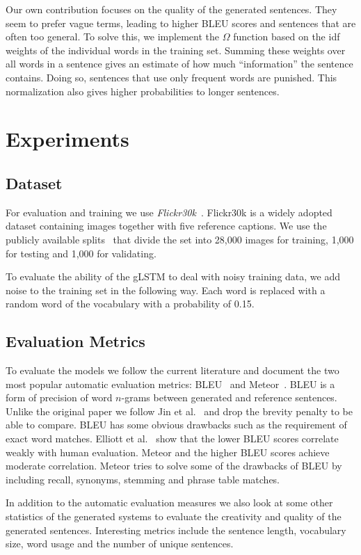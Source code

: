 \documentclass[twoside,twocolumn]{article}
\begin{document}
	Our own contribution focuses on the quality of the generated sentences. They seem to prefer vague terms, leading to higher BLEU scores and sentences that are often too general. To solve this, we implement the $\Omega$ function based on the idf weights of the individual words in the training set. Summing these weights over all words in a sentence gives an estimate of how much ``information'' the sentence contains. Doing so, sentences that use only frequent words are punished. This normalization also gives higher probabilities to longer sentences.
	
	
	\section{Experiments}
	\label{sec:exp}
	\subsection{Dataset}
	For evaluation and training we use \emph{Flickr30k}~\cite{Young2014}. Flickr30k is a widely adopted dataset containing images together with five reference captions. We use the publicly available splits~\cite{Karpathy2014} that divide the set into 28,000 images for training, 1,000 for testing and 1,000 for validating. 
	
	To evaluate the ability of the gLSTM to deal with noisy training data, we add noise to the training set in the following way.
	Each word is replaced with a random word of the vocabulary with a probability of 0.15.
	
	\subsection{Evaluation Metrics}
	To evaluate the models we follow the current literature and document the two most popular automatic evaluation metrics: BLEU~\cite{Papineni2002} and Meteor~\cite{Denkowski2007a}. BLEU is a form of precision of word $n$-grams between generated and reference sentences. Unlike the original paper we follow Jin et al.~\cite{Jin2015} and drop the brevity penalty to be able to compare. BLEU has some obvious drawbacks such as the requirement of exact word matches. Elliott et al.~\cite{Elliott2014} show that the lower BLEU scores correlate weakly with human evaluation. Meteor and the higher BLEU scores achieve moderate correlation. Meteor tries to solve some of the drawbacks of BLEU by including recall, synonyms, stemming and phrase table matches.
	
	In addition to the automatic evaluation measures we also look at some other statistics of the generated systems to evaluate the creativity and quality of the generated sentences.
	Interesting metrics include the sentence length, vocabulary size, word usage and the number of unique sentences.
	
\end{document}
